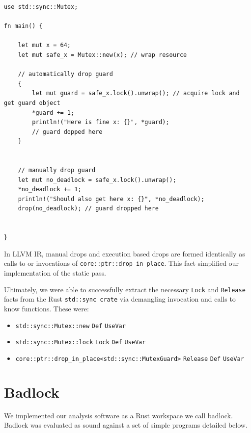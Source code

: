 \documentclass[conference]{IEEEtran}
\begin{document}
\begin{lstlisting}[caption={Rust Mutex Example}, label=lst:rust_example]
use std::sync::Mutex;

fn main() {

    let mut x = 64;
    let mut safe_x = Mutex::new(x); // wrap resource
    
    // automatically drop guard
    {
        let mut guard = safe_x.lock().unwrap(); // acquire lock and get guard object
        *guard += 1;
        println!("Here is fine x: {}", *guard);
        // guard dopped here
    }

    
    // manually drop guard
    let mut no_deadlock = safe_x.lock().unwrap();
    *no_deadlock += 1;
    println!("Should also get here x: {}", *no_deadlock);
    drop(no_deadlock); // guard dropped here


}
\end{lstlisting}

In LLVM IR, manual drops and execution based drops are formed identically as calls to or invocations of \verb|core::ptr::drop_in_place|. This fact simplified our implementation of the static pass.

Ultimately, we were able to successfully extract the necessary \verb|Lock| and \verb|Release| facts from the Rust \verb|std::sync crate| via demangling invocation and calls to know functions. These were:

\begin{itemize}
    \item \verb|std::sync::Mutex::new|
    \subitem \verb|Def|
    \subitem \verb|UseVar|
    \item \verb|std::sync::Mutex::lock|
    \subitem \verb|Lock|
    \subitem \verb|Def|
    \subitem \verb|UseVar|
    \item \verb|core::ptr::drop_in_place<std::sync::MutexGuard>|
    \subitem \verb|Release|
    \subitem \verb|Def|
    \subitem \verb|UseVar|
\end{itemize}

\section{Badlock}
We implemented our analysis software as a Rust workspace we call badlock. Badlock was evaluated as sound against a set of simple programs detailed below.
\end{document}
